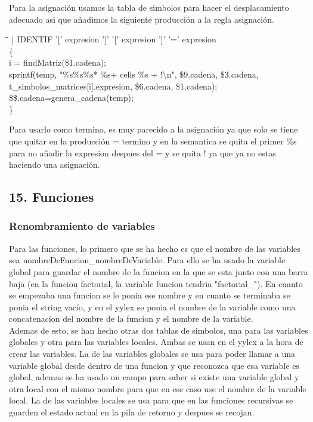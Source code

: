 \documentclass[11pt,spanish]{article}
\begin{document}
		Para la asignación usamos la tabla de simbolos para hacer el desplacamiento adecuado asi que añadimos la siguiente producción a la regla asignación.
		\begin{tcolorbox}
		\begin{tabbing}
			\hspace*{1cm}\=\hspace*{0.5cm}\=\hspace*{0.5cm}\=\kill
			| IDENTIF '[' expresion ']' '[' expresion ']' '=' expresion\\
			\>\{   \\
			\>\>i = findMatriz(\$1.cadena);\\
			\>\>sprintf(temp, "\%s\%s\%s* \%s+ cells \%s + !\textbackslash n", \$9.cadena, \$3.cadena,\\
			\>\>\> t\_simbolos\_matrices[i].expresion, \$6.cadena, \$1.cadena);\\
			\>\>\$\$.cadena=genera\_cadena(temp);  \\
			\>\}
		\end{tabbing}
		\end{tcolorbox}
		Para usarlo como termino, es muy parecido a la asignación ya que solo se tiene que quitar en la producción = termino y en la semantica se quita el primer \%s para no añadir la expresion despues del = y se quita ! ya que ya no estas haciendo una asignación.
		\subsection*{15. Funciones }
		\label{subsec:15}
		\subsubsection*{Renombramiento de variables}
		Para las funciones, lo primero que se ha hecho es que el nombre de las variables sea nombreDeFuncion\_nombreDeVariable. Para ello se ha usado la variable global para guardar el nombre de la funcion en la que se esta junto con una barra baja (en la funcion factorial, la variable funcion tendria "factorial\_"). En cuanto se empezaba una funcion se le ponia ese nombre y en cuanto se terminaba se ponia el string vacío, y en el yylex se ponia el nombre de la variable como una concatenacion del nombre de la funcion y el nombre de la variable.\\
		Ademas de esto, se han hecho otras dos tablas de simbolos, una para las variables globales y otra para las variables locales. Ambas se usan en el yylex a la hora de crear las variables. La de las variables globales se usa para poder llamar a una variable global desde dentro de una funcion y que reconozca que esa variable es global, ademas se ha usado un campo para saber si existe una variable global y otra local con el mismo nombre para que en ese caso use el nombre de la variable local. La de las variables locales se usa para que en las funciones recursivas se guarden el estado actual en la pila de retorno y despues se recojan.
\end{document}
